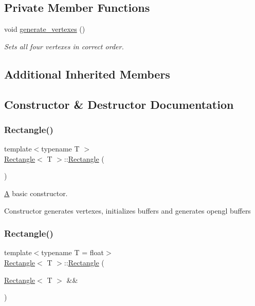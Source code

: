 \subsection*{Private Member Functions}
\begin{DoxyCompactItemize}
\item 
void \mbox{\hyperlink{classRectangle_a0f9d67fb9478883f067c47cdc7bf7bca}{generate\+\_\+vertexes}} ()
\begin{DoxyCompactList}\small\item\em Sets all four vertexes in correct order. \end{DoxyCompactList}\end{DoxyCompactItemize}
\subsection*{Additional Inherited Members}


\subsection{Constructor \& Destructor Documentation}
\mbox{\label{classRectangle_a9d9da3fc8bcb125516cbf2d711d325eb}} 
\subsubsection{\texorpdfstring{Rectangle()}{Rectangle()}\hspace{0.1cm}{\footnotesize\ttfamily [1/3]}}
{\footnotesize\ttfamily template$<$typename T $>$ \\
\mbox{\hyperlink{classRectangle}{Rectangle}}$<$ T $>$\+::\mbox{\hyperlink{classRectangle}{Rectangle}} (\begin{DoxyParamCaption}{ }\end{DoxyParamCaption})}



\mbox{\hyperlink{classA}{A}} basic constructor. 

Constructor generates vertexes, initializes buffers and generates opengl buffers \mbox{\label{classRectangle_a34cf921863291153b40d9b447f812aa4}} 
\subsubsection{\texorpdfstring{Rectangle()}{Rectangle()}\hspace{0.1cm}{\footnotesize\ttfamily [2/3]}}
{\footnotesize\ttfamily template$<$typename T  = float$>$ \\
\mbox{\hyperlink{classRectangle}{Rectangle}}$<$ T $>$\+::\mbox{\hyperlink{classRectangle}{Rectangle}} (\begin{DoxyParamCaption}\item[{\mbox{\hyperlink{classRectangle}{Rectangle}}$<$ T $>$ \&\&}]{ }\end{DoxyParamCaption})\hspace{0.3cm}{\ttfamily [default]}}

